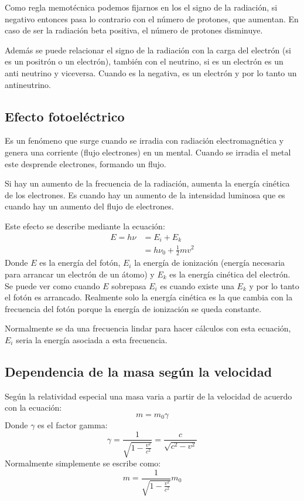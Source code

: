 \documentclass[arial,a4paper,print]{article}
\begin{document}
Como regla memotécnica podemos fijarnos en los el signo de la radiación, si negativo entonces pasa lo contrario con el número de protones, que aumentan. En caso de ser la radiación beta positiva, el número de protones disminuye. 

Además se puede relacionar el signo de la radiación con la carga del electrón (si es un positrón o un electrón), también con el neutrino, si es un electrón es un anti neutrino y viceversa. Cuando es la negativa, es un electrón y por lo tanto un antineutrino.

\subsection{Efecto fotoeléctrico}
Es un fenómeno que surge cuando se irradia con radiación electromagnética y genera una corriente (flujo electrones) en un mental. Cuando se irradia el metal este desprende electrones, formando un flujo. 

Si hay un aumento de la frecuencia de la radiación, aumenta la energía cinética de los electrones. Es cuando hay un aumento de la intensidad luminosa que es cuando hay un aumento del flujo de electrones. 

Este efecto se describe mediante la ecuación:
\begin{align*}
	E = h\nu &= E_{i} + E_{k} \\
	&= h\nu_0 + \frac12mv^2 
\end{align*}
Donde $E$ es la energía del fotón, $E_{i}$ la energía de ionización (energía necesaria para arrancar un electrón de un átomo) y $E_{k}$ es la energía cinética del electrón. Se puede ver como cuando $E$ sobrepasa $E_{i}$ es cuando existe una $E_{k}$ y por lo tanto el fotón es arrancado. Realmente solo la energía cinética es la que cambia con la frecuencia del fotón porque la energía de ionización se queda constante. 

Normalmente se da una frecuencia lindar para hacer cálculos con esta ecuación, $E_{i}$ seria la energía asociada a esta frecuencia. 

\subsection{Dependencia de la masa según la velocidad}
Según la relatividad especial una masa varia a partir de la velocidad de acuerdo con la ecuación:
\begin{equation*}
	m=m_{0}\gamma
\end{equation*}
Donde $\gamma$ es el factor gamma:
\begin{equation*}
	\gamma = \frac{1}{\sqrt{1-\frac{v^2}{c^{2}}}} = \frac{c}{\sqrt{c^{2} - v^2}}
\end{equation*}
Normalmente simplemente se escribe como:
\begin{equation*}
	m=\frac{1}{\sqrt{1-\frac{v^2}{c^{2}}}}m_{0}
\end{equation*}
\end{document}
